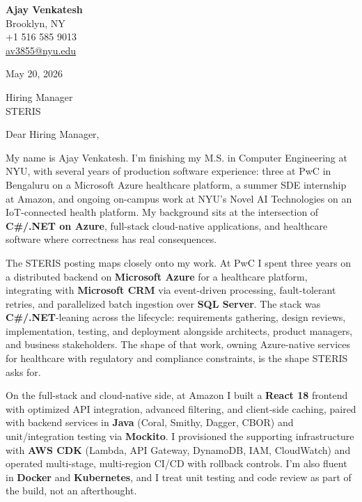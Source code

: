 \documentclass[letterpaper,11pt]{article}
\begin{document}
\begin{flushleft}
\textbf{\large Ajay Venkatesh} \\
Brooklyn, NY \\
+1 516 585 9013 \\
\href{mailto:av3855@nyu.edu}{av3855@nyu.edu}
\end{flushleft}

\vspace{10pt}

May 20, 2026

\vspace{6pt}

Hiring Manager \\
STERIS

\vspace{10pt}

Dear Hiring Manager,

My name is Ajay Venkatesh. I'm finishing my M.S. in Computer Engineering at NYU, with several years of production software experience: three at PwC in Bengaluru on a Microsoft Azure healthcare platform, a summer SDE internship at Amazon, and ongoing on-campus work at NYU's Novel AI Technologies on an IoT-connected health platform. My background sits at the intersection of \textbf{C\#/.NET on Azure}, full-stack cloud-native applications, and healthcare software where correctness has real consequences.

The STERIS posting maps closely onto my work. At PwC I spent three years on a distributed backend on \textbf{Microsoft Azure} for a healthcare platform, integrating with \textbf{Microsoft CRM} via event-driven processing, fault-tolerant retries, and parallelized batch ingestion over \textbf{SQL Server}. The stack was \textbf{C\#/.NET}-leaning across the lifecycle: requirements gathering, design reviews, implementation, testing, and deployment alongside architects, product managers, and business stakeholders. The shape of that work, owning Azure-native services for healthcare with regulatory and compliance constraints, is the shape STERIS asks for.

On the full-stack and cloud-native side, at Amazon I built a \textbf{React 18} frontend with optimized API integration, advanced filtering, and client-side caching, paired with backend services in \textbf{Java} (Coral, Smithy, Dagger, CBOR) and unit/integration testing via \textbf{Mockito}. I provisioned the supporting infrastructure with \textbf{AWS CDK} (Lambda, API Gateway, DynamoDB, IAM, CloudWatch) and operated multi-stage, multi-region CI/CD with rollback controls. I'm also fluent in \textbf{Docker} and \textbf{Kubernetes}, and I treat unit testing and code review as part of the build, not an afterthought.
\end{document}
